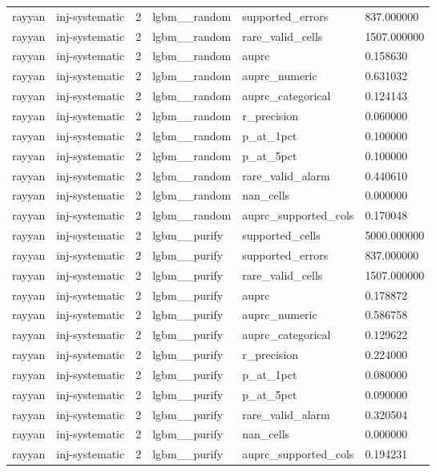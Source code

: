\begin{tabular}{llllll}
rayyan & inj-systematic & 2 & lgbm\_\_random & supported\_errors & 837.000000 \\
rayyan & inj-systematic & 2 & lgbm\_\_random & rare\_valid\_cells & 1507.000000 \\
rayyan & inj-systematic & 2 & lgbm\_\_random & auprc & 0.158630 \\
rayyan & inj-systematic & 2 & lgbm\_\_random & auprc\_numeric & 0.631032 \\
rayyan & inj-systematic & 2 & lgbm\_\_random & auprc\_categorical & 0.124143 \\
rayyan & inj-systematic & 2 & lgbm\_\_random & r\_precision & 0.060000 \\
rayyan & inj-systematic & 2 & lgbm\_\_random & p\_at\_1pct & 0.100000 \\
rayyan & inj-systematic & 2 & lgbm\_\_random & p\_at\_5pct & 0.100000 \\
rayyan & inj-systematic & 2 & lgbm\_\_random & rare\_valid\_alarm & 0.440610 \\
rayyan & inj-systematic & 2 & lgbm\_\_random & nan\_cells & 0.000000 \\
rayyan & inj-systematic & 2 & lgbm\_\_random & auprc\_supported\_cols & 0.170048 \\
rayyan & inj-systematic & 2 & lgbm\_\_purify & supported\_cells & 5000.000000 \\
rayyan & inj-systematic & 2 & lgbm\_\_purify & supported\_errors & 837.000000 \\
rayyan & inj-systematic & 2 & lgbm\_\_purify & rare\_valid\_cells & 1507.000000 \\
rayyan & inj-systematic & 2 & lgbm\_\_purify & auprc & 0.178872 \\
rayyan & inj-systematic & 2 & lgbm\_\_purify & auprc\_numeric & 0.586758 \\
rayyan & inj-systematic & 2 & lgbm\_\_purify & auprc\_categorical & 0.129622 \\
rayyan & inj-systematic & 2 & lgbm\_\_purify & r\_precision & 0.224000 \\
rayyan & inj-systematic & 2 & lgbm\_\_purify & p\_at\_1pct & 0.080000 \\
rayyan & inj-systematic & 2 & lgbm\_\_purify & p\_at\_5pct & 0.090000 \\
rayyan & inj-systematic & 2 & lgbm\_\_purify & rare\_valid\_alarm & 0.320504 \\
rayyan & inj-systematic & 2 & lgbm\_\_purify & nan\_cells & 0.000000 \\
rayyan & inj-systematic & 2 & lgbm\_\_purify & auprc\_supported\_cols & 0.194231 \\

\end{tabular}
